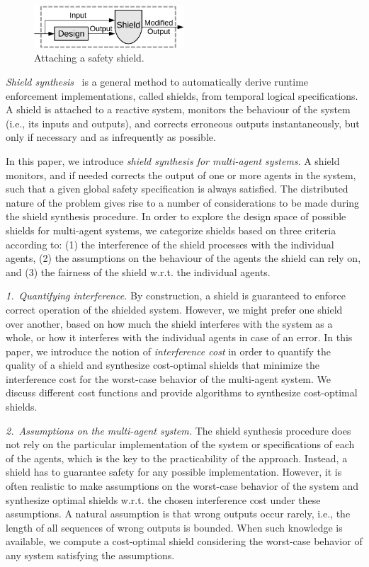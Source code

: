\begin{figure}
\centering
\includegraphics[width=0.5\textwidth]{MultiShield/figs/attach_shield}
\caption{Attaching a safety shield.}
\label{fig:attach_shield}
\vspace{-.3cm}
\end{figure}
\emph{Shield synthesis}~\cite{KonighoferABHKT17} is a general method to automatically derive runtime enforcement implementations, called shields,
from temporal logical specifications.
A shield is attached to a reactive system, monitors the behaviour of the system (i.e., its inputs and outputs), and corrects
erroneous outputs instantaneously, but only if necessary and as infrequently
as possible.


In this paper, we introduce \emph{shield synthesis for multi-agent systems}. A shield monitors, and if needed corrects the output of one or more agents in the system, such that a given global safety specification is always satisfied. The distributed nature of the problem gives rise to a number of considerations to be made during the shield synthesis procedure. In order to explore the design space of possible shields for multi-agent systems, we categorize shields based on three criteria according to:
(1) the interference of the shield processes with the individual agents,
(2) the assumptions on the behaviour of the agents the shield can rely on, and
(3) the fairness of the shield w.r.t. the individual agents.


\emph{1.\ Quantifying interference.}
By construction, a shield is guaranteed to enforce correct operation of the shielded system. However, we might prefer one shield over another, based on how much the shield interferes with the system as a whole, or how it interferes with the individual agents in case of an error. In this paper, we introduce the notion of  \emph{interference cost}
in order to quantify the quality of a shield
and synthesize cost-optimal shields that minimize the interference cost for the worst-case behavior of the multi-agent system.
We discuss different cost functions and provide algorithms to synthesize cost-optimal shields.

\emph{2.\ Assumptions on the multi-agent system.}
The shield synthesis procedure does not rely on the particular implementation of the system or specifications of each of the  agents, which is the key to the practicability of the approach. Instead, a shield has to guarantee safety for any possible implementation.
However, it is often realistic to make assumptions on the worst-case behavior of the system and  synthesize optimal shields w.r.t. the chosen interference cost under these assumptions. A natural assumption is that wrong outputs occur rarely, i.e., the length of all sequences of wrong outputs is bounded.
When such knowledge is available, we compute a cost-optimal shield considering the worst-case behavior of any system satisfying the assumptions.

